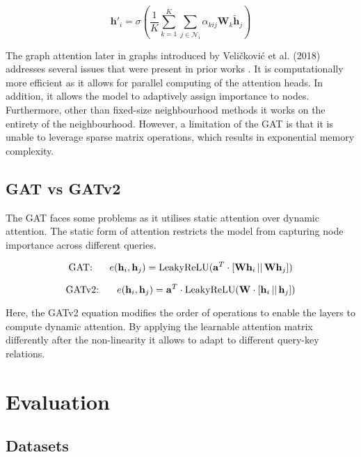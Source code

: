 \documentclass[runningheads]{llncs}
\begin{document}
\begin{equation}
    \mathbf{h}'_i = \sigma\left( \frac{1}{K} \sum_{k=1}^{K} \sum_{j \in \mathcal{N}_i} \alpha_{kij} \mathbf{W}_k \mathbf{\tilde{h}}_j \right)
\end{equation}

The graph attention later in graphs introduced by Veličković et al. (2018) addresses several issues that were present in prior works \cite{veličković2018graph}.  It is computationally more efficient as it allows for parallel computing of the attention heads. In addition, it allows the model to adaptively assign importance to nodes. Furthermore, other than fixed-size neighbourhood methods it works on the entirety of the neighbourhood. However, a limitation of the GAT is that it is unable to leverage sparse matrix operations, which results in exponential memory complexity.  

\subsection{GAT vs GATv2}
The GAT faces some problems as it utilises static attention over dynamic attention. The static form of attention restricts the model from capturing node importance across different queries. 

\begin{equation}
    \text{GAT: } \hspace{5mm} e(\mathbf{h}_i, \mathbf{h}_j) = \text{LeakyReLU}(\mathbf{a}^T \cdot [\mathbf{W}\mathbf{h}_i \,||\, \mathbf{W}\mathbf{h}_j])
\end{equation}

\begin{equation}
    \text{GATv2: } \hspace{5mm} e(\mathbf{h}_i, \mathbf{h}_j) = \mathbf{a}^T \cdot \text{LeakyReLU}(\mathbf{W} \cdot [\mathbf{h}_i \,||\, \mathbf{h}_j])
\end{equation}

Here, the GATv2 equation modifies the order of operations to enable the layers to compute dynamic attention. By applying the learnable attention matrix differently after the non-linearity it allows to adapt to different query-key relations. 


\section{Evaluation}

\subsection{Datasets}
\end{document}
